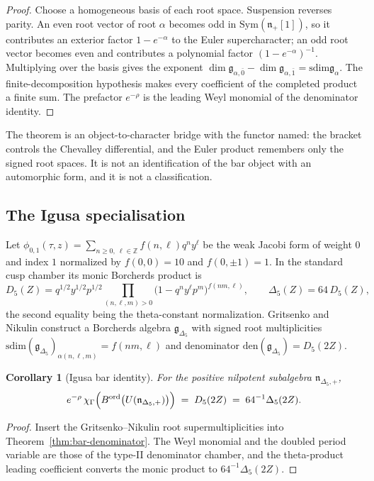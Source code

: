 \documentclass[11pt,reqno]{amsart}
\newtheorem{corollary}[theorem]{Corollary}
\theoremstyle{definition}
\theoremstyle{remark}
\providecommand{\Sym}{\mathrm{Sym}}
\providecommand{\sdim}{\mathrm{sdim}}
\providecommand{\den}{\mathrm{den}}
\begin{document}
\begin{proof}
Choose a homogeneous basis of each root space. Suspension reverses
parity. An even root vector of root $\alpha$ becomes odd in
$\Sym(\mathfrak n_+[1])$, so it contributes an exterior factor
$1-e^{-\alpha}$ to the Euler supercharacter; an odd root vector becomes
even and contributes a polynomial factor $(1-e^{-\alpha})^{-1}$.
Multiplying over the basis gives the exponent
$\dim\mathfrak g_{\alpha,\bar0}-\dim\mathfrak g_{\alpha,\bar1}
=\sdim\mathfrak g_\alpha$. The finite-decomposition hypothesis makes
every coefficient of the completed product a finite sum. The prefactor
$e^{-\rho}$ is the leading Weyl monomial of the denominator identity.
\end{proof}

The theorem is an object-to-character bridge with the functor named: the
bracket controls the Chevalley differential, and the Euler product
remembers only the signed root spaces. It is not an identification of
the bar object with an automorphic form, and it is not a classification.

\subsection{The Igusa specialisation}

Let $\phi_{0,1}(\tau,z)=\sum_{n\ge0,\ \ell\in\mathbb Z}f(n,\ell)q^ny^\ell$
be the weak Jacobi form of weight $0$ and index $1$ normalized by
$f(0,0)=10$ and $f(0,\pm1)=1$. In the standard cusp chamber its monic
Borcherds product is
\[
  D_5(Z) = q^{1/2}y^{1/2}p^{1/2}
  \prod_{(n,\ell,m)>0}\bigl(1-q^ny^\ell p^m\bigr)^{f(nm,\ell)},
  \qquad \Delta_5(Z) = 64\,D_5(Z),
\]
the second equality being the theta-constant normalization. Gritsenko and
Nikulin \cite{GN97} construct a Borcherds algebra
$\mathfrak g_{\Delta_5}$ with signed root multiplicities
$\sdim(\mathfrak g_{\Delta_5})_{\alpha(n,\ell,m)} = f(nm,\ell)$ and
denominator $\den(\mathfrak g_{\Delta_5}) = D_5(2Z)$.

\begin{corollary}[Igusa bar identity]
\label{cor:igusa}
For the positive nilpotent subalgebra $\mathfrak n_{\Delta_5,+}$,
\[
  e^{-\rho}\,
  \chi_\Gamma\Bigl(B^{\mathrm{ord}}\bigl(U(\mathfrak n_{\Delta_5,+})\bigr)\Bigr)
  \;=\; D_5(2Z) \;=\; 64^{-1}\Delta_5(2Z).
\]
\end{corollary}

\begin{proof}
Insert the Gritsenko--Nikulin root supermultiplicities into
Theorem~\ref{thm:bar-denominator}. The Weyl monomial and the doubled
period variable are those of the type-II denominator chamber, and the
theta-product leading coefficient converts the monic product to
$64^{-1}\Delta_5(2Z)$.
\end{proof}
\end{document}

